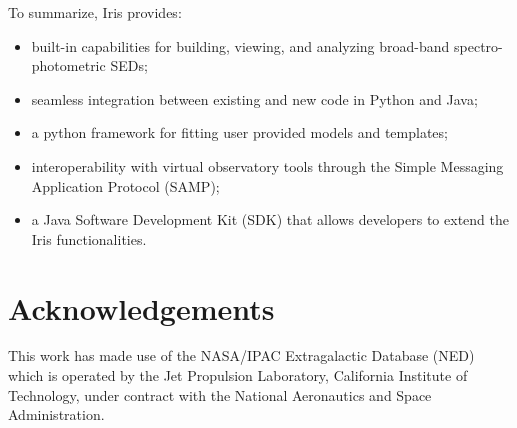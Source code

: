 \documentclass[5p]{elsarticle}
\begin{document}
To summarize, Iris provides:
\begin{itemize}
\item built-in capabilities for building, viewing, and analyzing broad-band spectro-photometric SEDs;
\item seamless integration between existing and new code in Python and Java;
\item a python framework for fitting user provided models and templates;
\item interoperability with virtual observatory tools through the Simple Messaging Application Protocol (SAMP);
\item a Java Software Development Kit (SDK) that allows developers to extend the Iris functionalities.
\end{itemize}

\section*{Acknowledgements}
This work has made use of the NASA/IPAC Extragalactic Database (NED) which is operated by the Jet Propulsion Laboratory, California Institute of Technology, under contract with the National Aeronautics and Space Administration.


\end{document}
